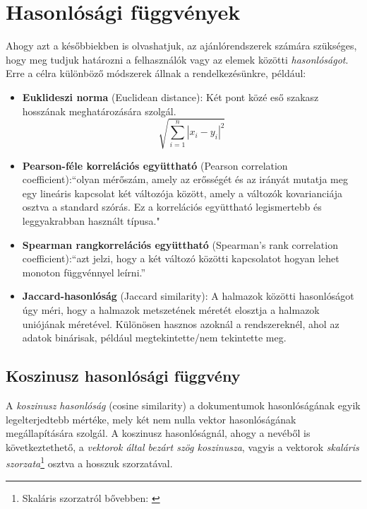 \documentclass[
]{thesis-ekf}
\theoremstyle{definition}
\theoremstyle{remark}
\begin{document}
\section{Hasonlósági függvények}
\label{sec-hasonlosagi-fuggvenyek}
Ahogy azt a későbbiekben is olvashatjuk, az ajánlórendszerek számára szükséges, hogy meg tudjuk határozni a felhasználók vagy az elemek közötti \emph{hasonlóságot}. Erre a célra különböző módszerek állnak a rendelkezésünkre, például: 
\begin{itemize}
	\item \textbf{Euklideszi norma} (Euclidean distance): Két pont közé eső szakasz hosszának meghatározására szolgál.\cite{wiki-tavolsag}
	\[\sqrt{\sum^{n}_{i=1}|x_{i}-y_{i}|^{2}}\]
	
	\item \textbf{Pearson-féle korrelációs együttható} (Pearson correlation coefficient):``olyan mérőszám, amely az erősségét és az irányát mutatja meg egy lineáris kapcsolat két változója között, amely a változók kovarianciája osztva a standard szórás. Ez a korrelációs együttható legismertebb és leggyakrabban használt típusa."\cite{wiki-korrelacios-egyutthato}
		
	\item \textbf{Spearman rangkorrelációs együttható} (Spearman's rank correlation coefficient):``azt jelzi, hogy a két változó közötti kapcsolatot hogyan lehet monoton függvénnyel leírni.''\cite{wiki-korrelacios-egyutthato}
	
	\item \textbf{Jaccard-hasonlóság} (Jaccard similarity): A halmazok közötti hasonlóságot úgy méri, hogy a halmazok metszetének méretét elosztja a halmazok uniójának méretével. Különösen hasznos azoknál a rendszereknél, ahol az adatok binárisak, például megtekintette/nem tekintette meg.\cite{book:introduction-to-data-minging}

\end{itemize}
\subsection{Koszinusz hasonlósági függvény}
\label{koszinusz-hasonlosagi-fuggveny}
A \emph{koszinusz hasonlóság} (cosine similarity) a dokumentumok hasonlóságának egyik legelterjedtebb mértéke, mely két nem nulla vektor hasonlóságának megállapítására szolgál. A koszinusz hasonlóságnál, ahogy a nevéből is következtethető, a \emph{vektorok által bezárt szög koszinusza}, vagyis a vektorok \emph{skaláris szorzata}\footnote{Skaláris szorzatról bővebben: \cite{wiki-skalaris-szorzat}} osztva a hosszuk szorzatával.\cite{book:introduction-to-data-minging, wiki-cosine-similarity}
\end{document}
